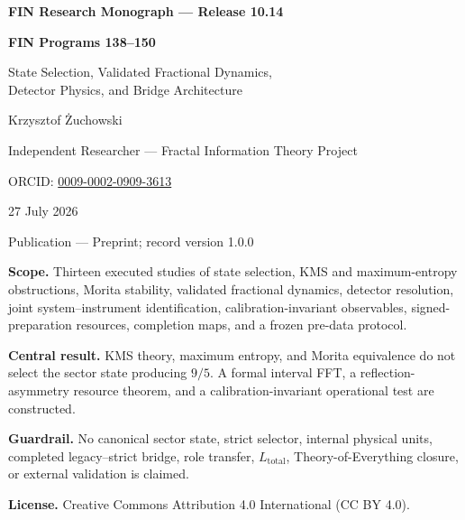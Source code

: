 \documentclass[11pt,a4paper,openany]{report}
\begin{document}
\hypersetup{pageanchor=false}
\begin{titlepage}
\centering
\vspace*{9mm}
{\Large\bfseries FIN Research Monograph --- Release 10.14\par}
\vspace{11mm}
{\Huge\bfseries FIN Programs 138--150\par}
\vspace{6mm}
{\Large State Selection, Validated Fractional Dynamics,\\
Detector Physics, and Bridge Architecture\par}
\vspace{17mm}
{\Large Krzysztof \.Zuchowski\par}
\vspace{2mm}
{\normalsize Independent Researcher --- Fractal Information Theory Project\par}
\vspace{2mm}
{\normalsize ORCID: \href{https://orcid.org/0009-0002-0909-3613}{0009-0002-0909-3613}\par}
\vspace{10mm}
{\large 27 July 2026\par}
{\normalsize Publication --- Preprint; record version 1.0.0\par}
\vfill
\begin{minipage}{0.88\textwidth}
\small
\textbf{Scope.} Thirteen executed studies of state selection, KMS and
maximum-entropy obstructions, Morita stability, validated fractional
dynamics, detector resolution, joint system--instrument identification,
calibration-invariant observables, signed-preparation resources, completion
maps, and a frozen pre-data protocol.

\medskip
\textbf{Central result.} KMS theory, maximum entropy, and Morita equivalence
do not select the sector state producing \(9/5\). A formal interval FFT,
a reflection-asymmetry resource theorem, and a calibration-invariant
operational test are constructed.

\medskip
\textbf{Guardrail.} No canonical sector state, strict selector, internal
physical units, completed legacy--strict bridge, role transfer,
\(L_{\mathrm{total}}\), Theory-of-Everything closure, or external validation
is claimed.

\medskip
\textbf{License.} Creative Commons Attribution 4.0 International (CC BY 4.0).
\end{minipage}
\vfill
\end{titlepage}
\hypersetup{pageanchor=true}
\end{document}
